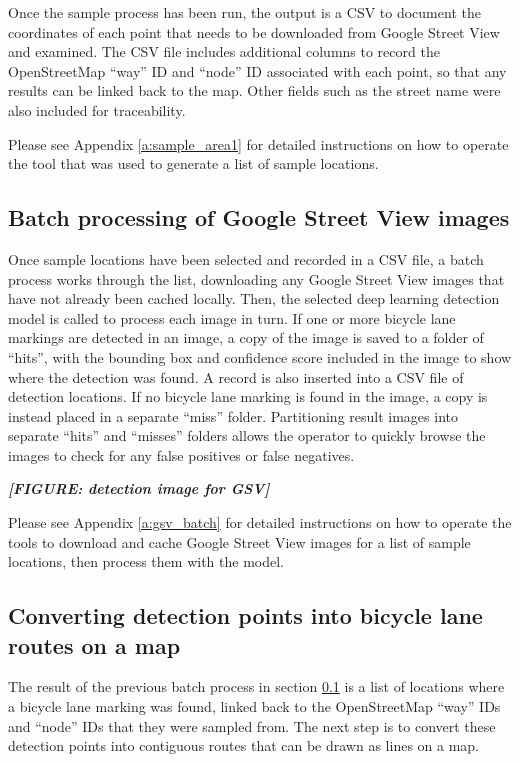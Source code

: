 \documentclass[11pt,twoside]{report}
\newcommand{\remark}[1]{{\bf \em [\marginpar{$\Leftarrow$}#1]}}
\begin{document}
Once the sample process has been run, the output is a CSV to document the coordinates of each point that needs to be downloaded from Google Street View and examined.  The CSV file includes additional columns to record the OpenStreetMap ``way'' ID and ``node'' ID associated with each point, so that any results can be linked back to the map.  Other fields such as the street name were also included for traceability.

Please see Appendix \ref{a:sample_area1} for detailed instructions on how to operate the tool that was used to generate a list of sample locations.


\subsection{Batch processing of Google Street View images}
\label{s:rq2b}

Once sample locations have been selected and recorded in a CSV file, a batch process works through the list, downloading any Google Street View images that have not already been cached locally.  Then, the selected deep learning detection model is called to process each image in turn.  If one or more bicycle lane markings are detected in an image, a copy of the image is saved to a folder of ``hits'', with the bounding box and confidence score included in the image to show where the detection was found.  A record is also inserted into a CSV file of detection locations.  If no bicycle lane marking is found in the image, a copy is instead placed in a separate ``miss'' folder.  Partitioning result images into separate  ``hits'' and ``misses'' folders allows the operator to quickly browse the images to check for any false positives or false negatives.

\remark{FIGURE: detection image for GSV}

Please see Appendix \ref{a:gsv_batch} for detailed instructions on how to operate the tools to download and cache Google Street View images for a list of sample locations, then process them with the model.


\subsection{Converting detection points into bicycle lane routes on a map}
\label{s:rq2c}

The result of the previous batch process in section \ref{s:rq2b} is a list of locations where a bicycle lane marking was found, linked back to the OpenStreetMap ``way'' IDs and ``node'' IDs that they were sampled from.  The next step is to convert these detection points into contiguous routes that can be drawn as lines on a map.
\end{document}
